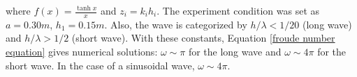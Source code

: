 where $f(x) = \frac{\tanh{x}}{x}$ and $z_i = k_i h_i$. The experiment condition was set as $a = 0.30m$, $h_{1} = 0.15m$. Also, the wave is categorized by $h/\lambda < 1/20$ (long wave) and $h/\lambda > 1/2$ (short wave). With these constants, Equation \ref{froude number equation} gives numerical solutions: $\omega \sim \pi$ for the long wave and $\omega \sim 4\pi$ for the short wave. In the case of a sinusoidal wave, $\omega \sim 4\pi$.






